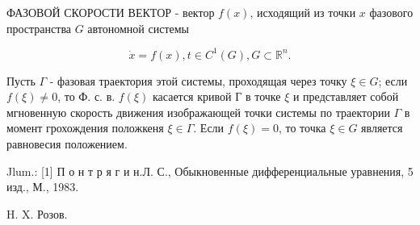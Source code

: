 \documentclass[10pt]{article}
\begin{document}
ФАЗОВОЙ СКОРОСТИ ВЕКТОР - вектор $f(x)$, исходящий из точки $x$ фазового пространства $G$ автономной системы



\[

\dot{x}=f(x), t \in C^{1}(G), G \subset \mathbb{R}^{n} .

\]



Пусть $\Gamma$ - фазовая траектория этой системы, проходящая через точку $\xi \in G$; если $f(\xi) \neq 0$, то Ф. с. в. $f(\xi)$ касается кривой Г в точке $\xi$ и представляет собой мгновенную скорость движения изображающей точки системы по траектории $\Gamma$ в момент грохождения положкеня $\xi \in \Gamma$. Если $f(\xi)=0$, то точка $\xi \in G$ является равновесия положением.



Jlum.: [1] П о н т р я г и н.Л. С., Обыкновенные дифференциальные уравнения, 5 изд., М., 1983.



H. X. Розов.
\end{document}

